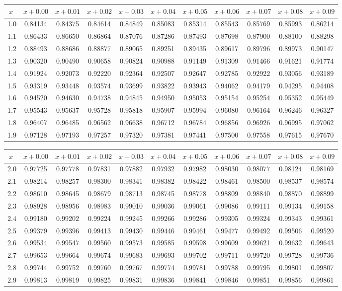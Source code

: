 \myskip
\begin{tabular}{|c|c|c|c|c|c|c|c|c|c|c|}
\hline
$x\;$&$x\!+\!0.00$&$x\!+\!0.01$&$x\!+\!0.02$&$x\!+\!0.03$&$x\!+\!0.04$&$x\!+\!0.05$&$x\!+\!0.06$&$x\!+\!0.07$&$x\!+\!0.08$&$x\!+\!0.09$\\\hline
1.0&0.84134&0.84375&0.84614&0.84849&0.85083&0.85314&0.85543&0.85769&0.85993&0.86214\\
1.1&0.86433&0.86650&0.86864&0.87076&0.87286&0.87493&0.87698&0.87900&0.88100&0.88298\\
1.2&0.88493&0.88686&0.88877&0.89065&0.89251&0.89435&0.89617&0.89796&0.89973&0.90147\\
1.3&0.90320&0.90490&0.90658&0.90824&0.90988&0.91149&0.91309&0.91466&0.91621&0.91774\\
1.4&0.91924&0.92073&0.92220&0.92364&0.92507&0.92647&0.92785&0.92922&0.93056&0.93189\\
1.5&0.93319&0.93448&0.93574&0.93699&0.93822&0.93943&0.94062&0.94179&0.94295&0.94408\\
1.6&0.94520&0.94630&0.94738&0.94845&0.94950&0.95053&0.95154&0.95254&0.95352&0.95449\\
1.7&0.95543&0.95637&0.95728&0.95818&0.95907&0.95994&0.96080&0.96164&0.96246&0.96327\\
1.8&0.96407&0.96485&0.96562&0.96638&0.96712&0.96784&0.96856&0.96926&0.96995&0.97062\\
1.9&0.97128&0.97193&0.97257&0.97320&0.97381&0.97441&0.97500&0.97558&0.97615&0.97670\\
\hline
\end{tabular}

\myskip
\begin{tabular}{|c|c|c|c|c|c|c|c|c|c|c|}
\hline
$x\;$&$x\!+\!0.00$&$x\!+\!0.01$&$x\!+\!0.02$&$x\!+\!0.03$&$x\!+\!0.04$&$x\!+\!0.05$&$x\!+\!0.06$&$x\!+\!0.07$&$x\!+\!0.08$&$x\!+\!0.09$\\\hline
2.0&0.97725&0.97778&0.97831&0.97882&0.97932&0.97982&0.98030&0.98077&0.98124&0.98169\\
2.1&0.98214&0.98257&0.98300&0.98341&0.98382&0.98422&0.98461&0.98500&0.98537&0.98574\\
2.2&0.98610&0.98645&0.98679&0.98713&0.98745&0.98778&0.98809&0.98840&0.98870&0.98899\\
2.3&0.98928&0.98956&0.98983&0.99010&0.99036&0.99061&0.99086&0.99111&0.99134&0.99158\\
2.4&0.99180&0.99202&0.99224&0.99245&0.99266&0.99286&0.99305&0.99324&0.99343&0.99361\\
2.5&0.99379&0.99396&0.99413&0.99430&0.99446&0.99461&0.99477&0.99492&0.99506&0.99520\\
2.6&0.99534&0.99547&0.99560&0.99573&0.99585&0.99598&0.99609&0.99621&0.99632&0.99643\\
2.7&0.99653&0.99664&0.99674&0.99683&0.99693&0.99702&0.99711&0.99720&0.99728&0.99736\\
2.8&0.99744&0.99752&0.99760&0.99767&0.99774&0.99781&0.99788&0.99795&0.99801&0.99807\\
2.9&0.99813&0.99819&0.99825&0.99831&0.99836&0.99841&0.99846&0.99851&0.99856&0.99861\\
\hline
\end{tabular}

\myskip
